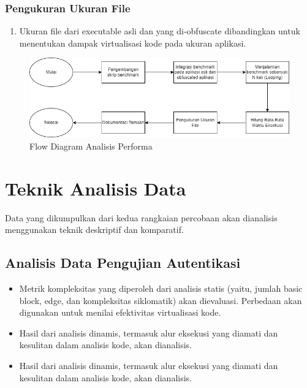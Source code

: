 \subsubsection{Pengukuran Ukuran File}
\begin{enumerate}
	\item {} Ukuran file dari executable asli dan yang di-obfuscate dibandingkan untuk menentukan dampak virtualisasi kode pada ukuran aplikasi.
\end{enumerate}

\begin{figure}
	\centering
	\includegraphics[width=1\textwidth]
	{assets/pics/Performance.png}
	\caption{Flow Diagram Analisis Performa}
\end{figure}

\section{Teknik Analisis Data}
Data yang dikumpulkan dari kedua rangkaian percobaan akan dianalisis menggunakan teknik deskriptif dan komparatif.
\subsection{Analisis Data Pengujian Autentikasi}
\begin{itemize}
  \item {} Metrik kompleksitas yang diperoleh dari analisis statis (yaitu, jumlah basic block, edge, dan kompleksitas siklomatik) akan dievaluasi. Perbedaan akan digunakan untuk menilai efektivitas virtualisasi kode.
  \item {} Hasil dari analisis dinamis, termasuk alur eksekusi yang diamati dan kesulitan dalam analisis kode, akan dianalisis.
  \item {} Hasil dari analisis dinamis, termasuk alur eksekusi yang diamati dan kesulitan dalam analisis kode, akan dianalisis.
\end{itemize}

